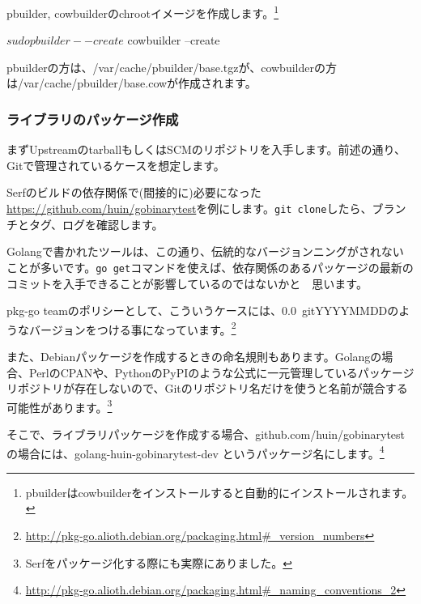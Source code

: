 \documentclass[mingoth,a4paper]{jsarticle}
\begin{document}
pbuilder, cowbuilderのchrootイメージを作成します。\footnote{pbuilderはcowbuilderをインストールすると自動的にインストールされます。}

\begin{commandline}
$ sudo pbuilder --create
$ cowbuilder --create
\end{commandline}
pbuilderの方は、/var/cache/pbuilder/base.tgzが、cowbuilderの方は/var/cache/pbuilder/base.cowが作成されます。

\subsubsection{ライブラリのパッケージ作成}

まずUpstreamのtarballもしくはSCMのリポジトリを入手します。前述の通り、Gitで管理されているケースを想定します。

Serfのビルドの依存関係で(間接的に)必要になった\url{https://github.com/huin/gobinarytest}を例にします。\texttt{git clone}したら、ブランチとタグ、ログを確認します。


Golangで書かれたツールは、この通り、伝統的なバージョンニングがされないことが多いです。\texttt{go get}コマンドを使えば、依存関係のあるパッケージの最新のコミットを入手できることが影響しているのではないかと　思います。

pkg-go teamのポリシーとして、こういうケースには、0.0~gitYYYYMMDDのようなバージョンをつける事になっています。\footnote{\url{http://pkg-go.alioth.debian.org/packaging.html\#_version_numbers}}

また、Debianパッケージを作成するときの命名規則もあります。Golangの場合、PerlのCPANや、PythonのPyPIのような公式に一元管理しているパッケージリポジトリが存在しないので、Gitのリポジトリ名だけを使うと名前が競合する可能性があります。\footnote{Serfをパッケージ化する際にも実際にありました。}

そこで、ライブラリパッケージを作成する場合、github.com/huin/gobinarytestの場合には、golang-huin-gobinarytest-dev というパッケージ名にします。\footnote{\url{http://pkg-go.alioth.debian.org/packaging.html\#_naming_conventions_2}}
\end{document}
